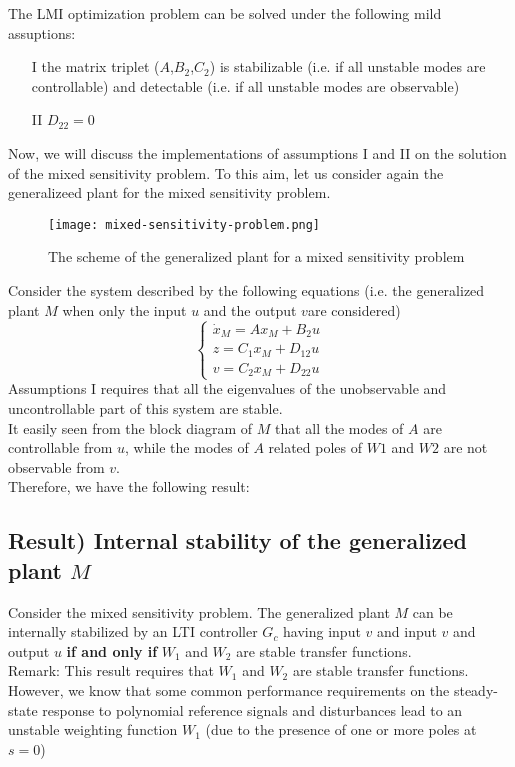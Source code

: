 The LMI optimization problem can be solved under the following mild assuptions:
\begin{itemize}
    \item[I] the matrix triplet ($A$,$B_2$,$C_2$) is stabilizable (i.e. if all unstable modes are controllable) and detectable (i.e. if all unstable modes are observable)
    \item[II] $D_{22} = 0$
\end{itemize}

Now, we will discuss the implementations of assumptions I and II on the solution of the mixed sensitivity problem. To this aim, let us consider again the generalizeed plant for the mixed sensitivity problem. 

\begin{figure}[H]
    \centering
    \texttt{[image: mixed-sensitivity-problem.png]}
    \caption{The scheme of the generalized plant for a mixed sensitivity problem}
\end{figure}

Consider the system described by the following equations (i.e. the generalized plant $M$ when only the input $u$ and the output $v$are considered)
\[
\begin{cases}
    \dot{x}_M = A x_M + B_2 u\\
z = C_1 x_M + D_{12} u\\
v = C_2 x_M + D_{22} u
\end{cases}
\]
Assumptions I requires that all the eigenvalues of the unobservable and uncontrollable part of this system are stable.\\

It easily seen from the block diagram of $M$ that all the modes of $A$ are controllable from $u$, while the modes of $A$ related poles of $W1$ and $W2$ are not observable from $v$.\\

Therefore, we have the following result:
\subsection{Result) Internal stability of the generalized plant $M$}
Consider the mixed sensitivity problem. The generalized plant 
$M$ can be internally stabilized by an LTI controller $G_c$ having input $v$ and input $v$ and output $u$ \textbf{if and only if} $W_1$ and $W_2$ are stable transfer functions.\\

Remark: This result requires that $W_1$ and $W_2$ are stable transfer functions. However, we know that some common performance requirements on the steady-state response to polynomial reference signals and disturbances lead to an unstable weighting function $W_1$ (due to the presence of one or more poles at $s = 0$)\\

